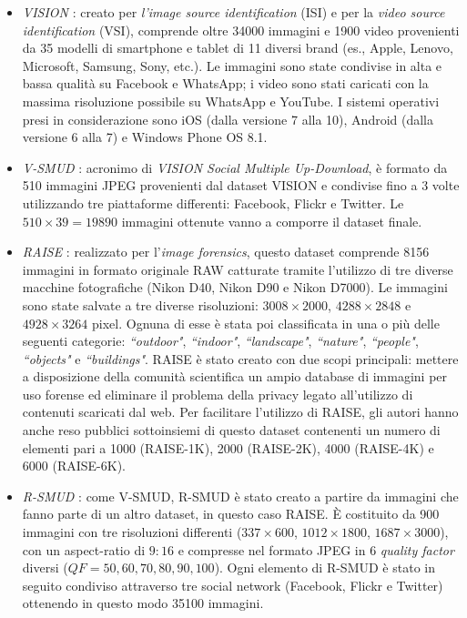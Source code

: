 \begin{itemize}
    \item \textit{VISION} \cite{shullani2017vision}: creato per \textit{l'image source identification} (ISI) e per la \textit{video source identification} (VSI), comprende oltre 34000 immagini e 1900 video provenienti da 35 modelli di smartphone e tablet di 11 diversi brand (es., Apple, Lenovo, Microsoft, Samsung, Sony, etc.). Le immagini sono state condivise in alta e bassa qualità su Facebook e WhatsApp; i video sono stati caricati con la massima risoluzione possibile su WhatsApp e YouTube. I sistemi operativi presi in considerazione sono iOS (dalla versione 7 alla 10), Android (dalla versione 6 alla 7) e Windows Phone OS 8.1.
    
    \item \textit{V-SMUD} \cite{phan2019tracking}: acronimo di \textit{VISION Social Multiple Up-Download}, è formato da 510 immagini JPEG provenienti dal dataset VISION e condivise fino a 3 volte utilizzando tre piattaforme differenti: Facebook, Flickr e Twitter. Le $510\times39 = 19890$ immagini ottenute vanno a comporre il dataset finale.
    
    \item \textit{RAISE} \cite{dang2015raise}: realizzato per l'\textit{image forensics}, questo dataset comprende 8156 immagini in formato originale RAW catturate tramite l'utilizzo di tre diverse macchine fotografiche (Nikon D40, Nikon D90 e Nikon D7000). Le immagini sono state salvate a tre diverse risoluzioni: $3008\times2000$, $4288\times2848$ e $4928\times3264$ pixel. Ognuna di esse è stata poi classificata in una o più delle seguenti categorie: \textit{“outdoor"}, \textit{“indoor"}, \textit{“landscape"}, \textit{“nature"}, \textit{“people"}, \textit{“objects"} e \textit{“buildings"}. RAISE è stato creato con due scopi principali: mettere a disposizione della comunità scientifica un ampio database di immagini per uso forense ed eliminare il problema della privacy legato all'utilizzo di contenuti scaricati dal web. Per facilitare l'utilizzo di RAISE, gli autori hanno anche reso pubblici sottoinsiemi di questo dataset contenenti un numero di elementi pari a 1000 (RAISE-1K), 2000 (RAISE-2K), 4000 (RAISE-4K) e 6000 (RAISE-6K).
    
    \item \textit{R-SMUD} \cite{phan2019tracking}: come V-SMUD, R-SMUD è stato creato a partire da immagini che fanno parte di un altro dataset, in questo caso RAISE. È costituito da 900 immagini con tre risoluzioni differenti ($337\times600$, $1012\times1800$, $1687\times3000$), con un aspect-ratio di $9:16$ e compresse nel formato JPEG in 6 \textit{quality factor} diversi ($QF = 50, 60, 70, 80, 90, 100$). Ogni elemento di R-SMUD è stato in seguito condiviso attraverso tre social network (Facebook, Flickr e Twitter) ottenendo in questo modo 35100 immagini.
    

\end{itemize}
